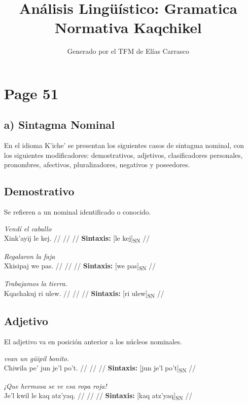 \documentclass{article}%
\title{Análisis Lingüístico: Gramatica Normativa Kaqchikel}%
\author{Generado por el TFM de Elías Carrasco}%
\begin{document}
%
\normalsize%
\maketitle%
\section{Page 51}%
\label{sec:Page51}%
\subsection{a) Sintagma Nominal}%
\label{subsec:a)SintagmaNominal}%

%
En el idioma K’iche’ se presentan los siguientes casos de sintagma nominal, con los siguientes modificadores: demostrativos, adjetivos, clasificadores personales, pronombres, afectivos, pluralizadores, negativos y poseedores. %
\subsection{Demostrativo}%
\label{subsec:Demostrativo}%

%
Se refieren a un nominal identificado o conocido. %
\par\medskip%
\ex
\textit{Vendí el caballo} \\
\begingl
\gla Xink’ayij le kej. //
\glb  //
\glc  //
\glft \textbf{Sintaxis:} [le kej]\textsubscript{SN} //
\endgl
\xe
%
\medskip%
\par\medskip%
\ex
\textit{Regalaron la faja} \\
\begingl
\gla Xkisipaj we pas. //
\glb  //
\glc  //
\glft \textbf{Sintaxis:} [we pas]\textsubscript{SN} //
\endgl
\xe
%
\medskip%
\par\medskip%
\ex
\textit{Trabajamos la tierra.} \\
\begingl
\gla Kqachakuj ri ulew. //
\glb  //
\glc  //
\glft \textbf{Sintaxis:} [ri ulew]\textsubscript{SN} //
\endgl
\xe
%
\medskip%
\subsection{Adjetivo}%
\label{subsec:Adjetivo}%

%
El adjetivo va en posición anterior a los núcleos nominales. %
\par\medskip%
\ex
\textit{vean un güipil bonito.} \\
\begingl
\gla Chiwila pe’ jun je’l po’t. //
\glb  //
\glc  //
\glft \textbf{Sintaxis:} [jun je’l po’t]\textsubscript{SN} //
\endgl
\xe
%
\medskip%
\par\medskip%
\ex
\textit{¡Que hermosa se ve esa ropa roja!} \\
\begingl
\gla Je’l kwil le kaq atz’yaq. //
\glb  //
\glc  //
\glft \textbf{Sintaxis:} [kaq atz’yaq]\textsubscript{SN} //
\endgl
\xe
%
\medskip%
\end{document}
